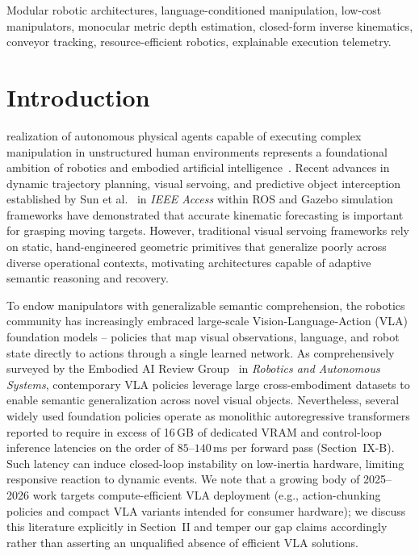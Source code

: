 \documentclass[journal]{IEEEtran}
\begin{document}
\begin{IEEEkeywords}
Modular robotic architectures, language-conditioned manipulation, low-cost manipulators, monocular metric depth estimation, closed-form inverse kinematics, conveyor tracking, resource-efficient robotics, explainable execution telemetry.
\end{IEEEkeywords}

\IEEEpeerreviewmaketitle

\section{Introduction}
 realization of autonomous physical agents capable of executing complex manipulation in unstructured human environments represents a foundational ambition of robotics and embodied artificial intelligence~\cite{aria_base_sun2022moving}. Recent advances in dynamic trajectory planning, visual servoing, and predictive object interception established by Sun et al.~\cite{aria_base_sun2022moving} in \textit{IEEE Access} within ROS and Gazebo simulation frameworks have demonstrated that accurate kinematic forecasting is important for grasping moving targets. However, traditional visual servoing frameworks rely on static, hand-engineered geometric primitives that generalize poorly across diverse operational contexts, motivating architectures capable of adaptive semantic reasoning and recovery.

To endow manipulators with generalizable semantic comprehension, the robotics community has increasingly embraced large-scale Vision-Language-Action (VLA) foundation models -- policies that map visual observations, language, and robot state directly to actions through a single learned network. As comprehensively surveyed by the Embodied AI Review Group~\cite{aria_027_group_2024_visionlanguageaction} in \textit{Robotics and Autonomous Systems}, contemporary VLA policies leverage large cross-embodiment datasets to enable semantic generalization across novel visual objects. Nevertheless, several widely used foundation policies operate as monolithic autoregressive transformers reported to require in excess of 16\,GB of dedicated VRAM and control-loop inference latencies on the order of $85$--$140$\,ms per forward pass (Section~IX-B). Such latency can induce closed-loop instability on low-inertia hardware, limiting responsive reaction to dynamic events. We note that a growing body of 2025--2026 work targets compute-efficient VLA deployment (e.g., action-chunking policies and compact VLA variants intended for consumer hardware); we discuss this literature explicitly in Section~II and temper our gap claims accordingly rather than asserting an unqualified absence of efficient VLA solutions.
\end{document}
